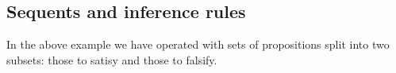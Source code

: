 

\setcounter{section}{2}
\setcounter{subsection}{4}
\setcounter{dfn}{5}

\subsection{Sequents and inference rules}
In the above example we have operated with sets of propositions split into two subsets: those to satisy and those to falsify.


